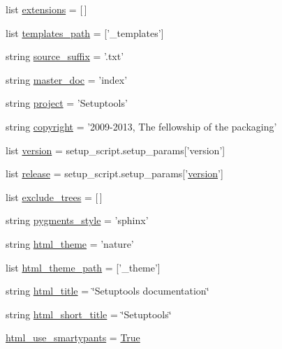 \begin{DoxyCompactItemize}
\item 
list \hyperlink{namespaceconf_a540efa67c53e84c1c353c1df2e37e39c}{extensions} = \mbox{[}$\,$\mbox{]}
\item 
list \hyperlink{namespaceconf_af50129dcc1f90655539f025595a3093b}{templates\+\_\+path} = \mbox{[}'\+\_\+templates'\mbox{]}
\item 
string \hyperlink{namespaceconf_a1e0ba7f4cb1d50fa831f1236a77d60f6}{source\+\_\+suffix} = '.txt'
\item 
string \hyperlink{namespaceconf_ae22a29d94a222730836db739d6dbd71e}{master\+\_\+doc} = 'index'
\item 
string \hyperlink{namespaceconf_aa2c6aefbed1597a70cfb45a760e5977c}{project} = 'Setuptools'
\item 
string \hyperlink{namespaceconf_ac8ccf456b321bc9052c0691a173b6925}{copyright} = '2009-\/2013, The fellowship of the packaging'
\item 
list \hyperlink{namespaceconf_ae6c322f623b44d2a866d51d0b645d3d2}{version} = setup\+\_\+script.\+setup\+\_\+params\mbox{[}'version'\mbox{]}
\item 
list \hyperlink{namespaceconf_a90a599726178800ad5a42f6bc2cd5208}{release} = setup\+\_\+script.\+setup\+\_\+params\mbox{[}'\hyperlink{namespaceconf_ae6c322f623b44d2a866d51d0b645d3d2}{version}'\mbox{]}
\item 
list \hyperlink{namespaceconf_aa8a9845f7e0bc1a109b463c6efe6db86}{exclude\+\_\+trees} = \mbox{[}$\,$\mbox{]}
\item 
string \hyperlink{namespaceconf_afa4e4ed164119ef5f4656e9554ed1f1b}{pygments\+\_\+style} = 'sphinx'
\item 
string \hyperlink{namespaceconf_a7f1b143ff25817758abd21a7db110510}{html\+\_\+theme} = 'nature'
\item 
list \hyperlink{namespaceconf_a98891f2e4a5d0fc6e8cbe787fb9c2439}{html\+\_\+theme\+\_\+path} = \mbox{[}'\+\_\+theme'\mbox{]}
\item 
string \hyperlink{namespaceconf_a21723aa72b000ec08ec9fdab86bddebb}{html\+\_\+title} = \char`\"{}Setuptools documentation\char`\"{}
\item 
string \hyperlink{namespaceconf_ad2add41c6043d1066cc180e8d57cc4da}{html\+\_\+short\+\_\+title} = \char`\"{}Setuptools\char`\"{}
\item 
\hyperlink{namespaceconf_a0543ec4ed2f4f7a56f17b30c2e9e4916}{html\+\_\+use\+\_\+smartypants} = \hyperlink{libqhull_8h_add3ca9eefe3b5b754426f51d3043e579}{True}
\item 

\end{DoxyCompactItemize}
